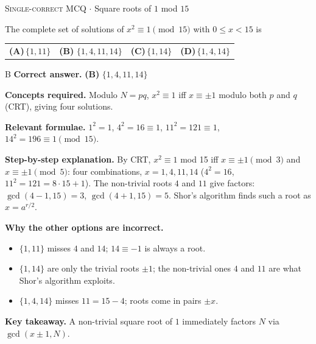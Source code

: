\documentclass[11pt,a4paper]{article}
\newcommand{\optlabel}[1]{\textbf{(#1)}}
\newcommand{\correctlabel}[1]{\textcolor{okgreen}{\textbf{(#1)}\,\ding{51}}}
\newenvironment{qitem}[1]{\begin{list}{}{\setlength{\leftmargin}{3.3em}\setlength{\labelwidth}{3.1em}%
  \setlength{\labelsep}{0.2em}\setlength{\topsep}{3pt}\setlength{\parsep}{3pt}}\item[\textbf{Q.#1}\hfill]}{\end{list}}
\newcommand{\qsep}{\par\vspace{2pt}{\color{black!15}\hrule}\vspace{4pt}}
\newcommand{\qmeta}[2]{{\footnotesize\color{black!60}\textsc{#1} \;$\cdot$\; #2}\par}
\begin{document}
\begin{qitem}{10}
\qmeta{Single-correct MCQ}{Square roots of $1$ mod $15$}
The complete set of solutions of $x^2 \equiv 1 \pmod{15}$ with $0 \le x < 15$ is
\par\smallskip\noindent\begin{tabularx}{\linewidth}{@{}*{4}{L}@{}}
\optlabel{A}\,$\{1, 11\}$ & \correctlabel{B}\,$\{1, 4, 11, 14\}$ & \optlabel{C}\,$\{1, 14\}$ & \optlabel{D}\,$\{1, 4, 14\}$
\end{tabularx}
\end{qitem}
\begin{solbox}{B}
\textbf{\color{brand}Correct answer.} \textcolor{okgreen}{\textbf{(B)}} $\{1, 4, 11, 14\}$

\textbf{\color{brand}Concepts required.} Modulo $N = pq$, $x^2 \equiv 1$ iff $x \equiv \pm1$ modulo both $p$ and $q$ (CRT), giving four solutions.

\textbf{\color{brand}Relevant formulae.} $1^2 = 1$, $4^2 = 16 \equiv 1$, $11^2 = 121 \equiv 1$, $14^2 = 196 \equiv 1 \pmod{15}$.

\textbf{\color{brand}Step-by-step explanation.} By CRT, $x^2 \equiv 1$ mod 15 iff $x \equiv \pm1 \pmod 3$ and $x \equiv \pm1 \pmod 5$: four combinations, $x = 1, 4, 11, 14$
($4^2 = 16$, $11^2 = 121 = 8\cdot15 + 1$). The non-trivial roots $4$ and $11$ give factors: $\gcd(4 - 1, 15) = 3$, $\gcd(4 + 1, 15) = 5$. Shor's algorithm
finds such a root as $x = a^{r/2}$.

\textbf{\color{brand}Why the other options are incorrect.}
\begin{itemize}[leftmargin=2.4em, itemsep=1pt, topsep=2pt]
\item[\textbf{(A)}] $\{1, 11\}$ misses $4$ and $14$; $14 \equiv -1$ is always a root.
\item[\textbf{(C)}] $\{1, 14\}$ are only the trivial roots $\pm1$; the non-trivial ones $4$ and $11$ are what Shor's algorithm exploits.
\item[\textbf{(D)}] $\{1, 4, 14\}$ misses $11 = 15 - 4$; roots come in pairs $\pm x$.
\end{itemize}
\textbf{\color{brand}Key takeaway.} A non-trivial square root of $1$ immediately factors $N$ via $\gcd(x \pm 1, N)$.
\end{solbox}
\qsep
\end{document}
